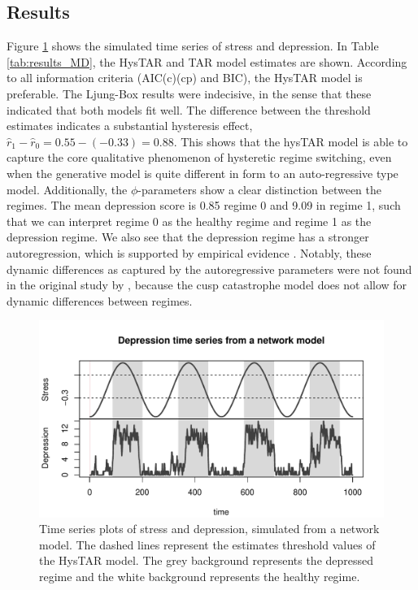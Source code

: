 \documentclass{article}
\begin{document}
\subsection{Results}
Figure \ref{fig:ts_plot_MD} shows the simulated time series of stress and depression.
In Table \ref{tab:results_MD}, the HysTAR and TAR model estimates are shown.
According to all information criteria (AIC(c)(cp) and BIC), the HysTAR model is preferable.
The Ljung-Box results were indecisive, in the sense that these indicated that both models fit well.
The difference between the threshold estimates indicates a substantial hysteresis effect, $\hat{r}_1 - \hat{r}_0 = 0.55 - (-0.33) = 0.88$.
This shows that the hysTAR model is able to capture the core qualitative phenomenon of hysteretic regime switching, even when the generative model is quite different in form to an auto-regressive type model.
Additionally, the $\phi$-parameters show a clear distinction between the regimes. The mean depression score is 0.85 regime 0 and 9.09 in regime 1,
such that we can interpret regime 0 as the healthy regime and regime 1 as the depression regime. We also see that the depression regime has a stronger autoregression, which is supported by empirical evidence \citep{kuppens_emotional_2010, koval_getting_2012}.
Notably, these dynamic differences as captured by the autoregressive parameters were not found in the original study by \citet{cramer_major_2016}, because the cusp catastrophe model does not allow for dynamic differences between regimes. 

\begin{figure} 
\begin{center}
\includegraphics[scale=.7]{MD_plot}
\caption{Time series plots of stress and depression, simulated from a network model. The dashed lines represent the estimates threshold values of the HysTAR model. The grey background represents the depressed regime and the white background represents the healthy regime.}
\label{fig:ts_plot_MD}
\end{center}
\end{figure}
\end{document}
